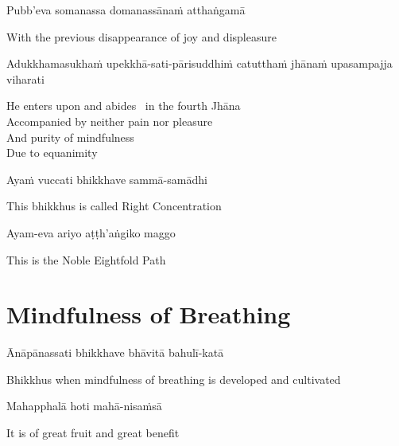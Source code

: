 Pubb’eva somanassa domanassānaṁ atthaṅgamā

\begin{english}
  With the previous disappearance of joy and displeasure
\end{english}

Adukkhamasukhaṁ upekkhā-sati-pārisuddhiṁ catutthaṁ jhānaṁ upasampajja viharati

\begin{english}
  He enters upon and abides \breathmark\ in the fourth Jhāna\\
  Accompanied by neither pain nor pleasure\\
  And purity of mindfulness\\
  Due to equanimity
\end{english}

Ayaṁ vuccati bhikkhave sammā-samādhi

\begin{english}
  This bhikkhus is called Right Concentration
\end{english}

Ayam-eva ariyo aṭṭh'aṅgiko maggo

\begin{english}
  This is the Noble Eightfold Path
\end{english}

\suttaRef{[SN 45.8]}


\section{Mindfulness of Breathing}
\label{mindfulness-of-breathing}

\begin{leader}
\end{leader}

Ānāpānassati bhikkhave bhāvitā bahulī-katā

\begin{english}
  Bhikkhus when mindfulness of breathing is developed and cultivated
\end{english}

Mahapphalā hoti mahā-nisaṁsā

\begin{english}
  It is of great fruit and great benefit
\end{english}

